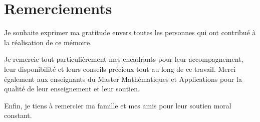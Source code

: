 \chapter*{Remerciements}

Je souhaite exprimer ma gratitude envers toutes les personnes qui ont contribué à la réalisation de ce mémoire.

Je remercie tout particulièrement mes encadrants pour leur accompagnement, leur disponibilité et leurs conseils précieux tout au long de ce travail. Merci également aux enseignants du Master Mathématiques et Applications pour la qualité de leur enseignement et leur soutien.

Enfin, je tiens à remercier ma famille et mes amis pour leur soutien moral constant.
